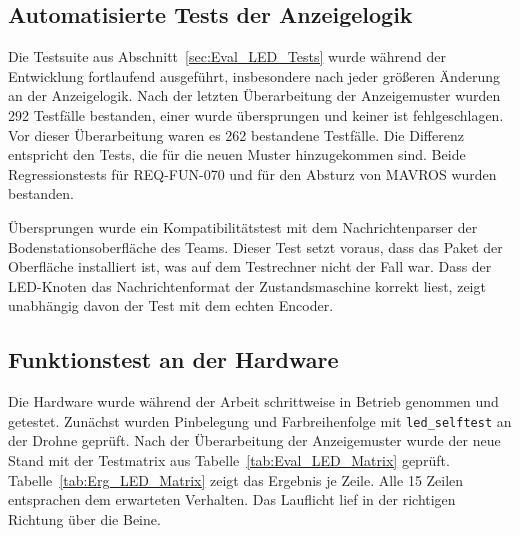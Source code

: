         \subsection{Automatisierte Tests der Anzeigelogik}
        \label{sec:Erg_LED_Tests}

        Die Testsuite aus Abschnitt~\ref{sec:Eval_LED_Tests} wurde während der Entwicklung fortlaufend ausgeführt, insbesondere nach jeder größeren Änderung an der Anzeigelogik. Nach der letzten Überarbeitung der Anzeigemuster wurden 292 Testfälle bestanden, einer wurde übersprungen und keiner ist fehlgeschlagen. Vor dieser Überarbeitung waren es 262 bestandene Testfälle. Die Differenz entspricht den Tests, die für die neuen Muster hinzugekommen sind. Beide Regressionstests für REQ-FUN-070 und für den Absturz von MAVROS wurden bestanden.

        Übersprungen wurde ein Kompatibilitätstest mit dem Nachrichtenparser der Bodenstationsoberfläche des Teams. Dieser Test setzt voraus, dass das Paket der Oberfläche installiert ist, was auf dem Testrechner nicht der Fall war. Dass der LED-Knoten das Nachrichtenformat der Zustandsmaschine korrekt liest, zeigt unabhängig davon der Test mit dem echten Encoder.

        \subsection{Funktionstest an der Hardware}
        \label{sec:Erg_LED_SIL}

        Die Hardware wurde während der Arbeit schrittweise in Betrieb genommen und getestet. Zunächst wurden Pinbelegung und Farbreihenfolge mit \texttt{led\_selftest} an der Drohne geprüft. Nach der Überarbeitung der Anzeigemuster wurde der neue Stand mit der Testmatrix aus Tabelle~\ref{tab:Eval_LED_Matrix} geprüft. Tabelle~\ref{tab:Erg_LED_Matrix} zeigt das Ergebnis je Zeile. Alle 15 Zeilen entsprachen dem erwarteten Verhalten. Das Lauflicht lief in der richtigen Richtung über die Beine.

